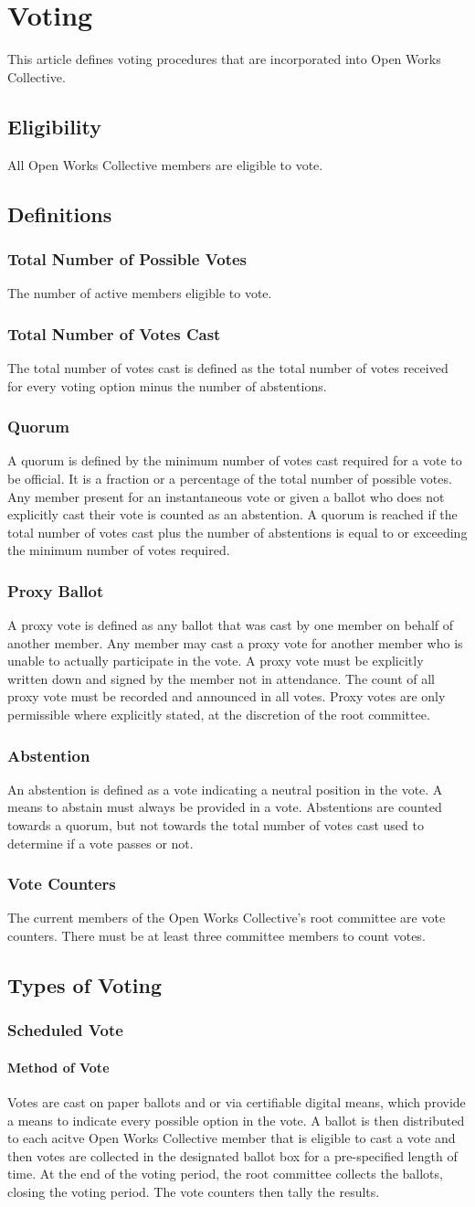 \documentclass{article}
\newcommand{\article}[1]{\section{#1} \label{#1}}
\newcommand{\asection}[1]{\subsection{#1} \label{#1}}
\newcommand{\asubsection}[1]{\subsubsection{#1} \label{#1}}
\newcommand{\asubsubsection}[1]{\paragraph{#1} \label{#1}}
\begin{document}

%
%
\article{Voting}
This article defines voting procedures that are incorporated into Open Works Collective.
\asection{Eligibility}
All Open Works Collective members are eligible to vote.
\asection{Definitions}
\asubsection{Total Number of Possible Votes}
The number of active members eligible to vote.
\asubsection{Total Number of Votes Cast}
The total number of votes cast is defined as the total number of votes received for every voting option minus the number of abstentions.
\asubsection{Quorum}
A quorum is defined by the minimum number of votes cast required for a vote to be official.
It is a fraction or a percentage of the total number of possible votes.
Any member present for an instantaneous vote or given a ballot who does not explicitly cast their vote is counted as an abstention.
A quorum is reached if the total number of votes cast plus the number of abstentions is equal to or exceeding the minimum number of votes required.
\asubsection{Proxy Ballot}
A proxy vote is defined as any ballot that was cast by one member on behalf of another member.
Any member may cast a proxy vote for another member who is unable to actually participate in the vote.
A proxy vote must be explicitly written down and signed by the member not in attendance.
The count of all proxy vote must be recorded and announced in all votes.
Proxy votes are only permissible where explicitly stated, at the discretion of the root committee.
\asubsection{Abstention}
An abstention is defined as a vote indicating a neutral position in the vote.
A means to abstain must always be provided in a vote.
Abstentions are counted towards a quorum, but not towards the total number of votes cast used to determine if a vote passes or not.
\asubsection{Vote Counters}
The current members of the Open Works Collective's root committee are vote counters. There must be at least three committee members to count votes.

\asection{Types of Voting}

\asubsection{Scheduled Vote}
\asubsubsection{Method of Vote}
Votes are cast on paper ballots and or via certifiable digital means, which provide a means to indicate every possible option in the vote.
A ballot is then distributed to each acitve Open Works Collective member that is eligible to cast a vote and then votes are collected in the designated ballot box for a pre-specified length of time.
At the end of the voting period, the root committee collects the ballots, closing the voting period.
The vote counters then tally the results.
\end{document}
